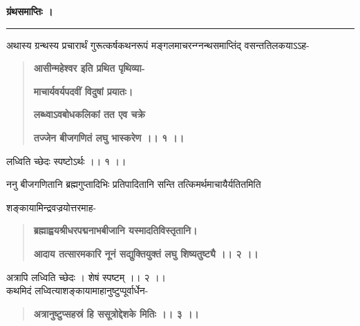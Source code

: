 \documentclass[11pt, openany]{book}
\begin{document}
\onehalfspacing
\begin{center}
\textbf{\large ग्रंथसमाप्तिः ।}

\rule{0.1\linewidth}{0.5pt}
\end{center}

\vspace{5mm}

\begin{sloppypar}
\hangindent=0.2in \hspace{0.2in}अथास्य ग्रन्थस्य प्रचारार्थं गुरूत्कर्षकथनरूपं मङ्गलमाचरन्ग्नन्थसमाप्तिंद् वसन्ततिलकयाऽऽह- 

\begin{quote}
\hspace{1in}\textbf{आसीन्महेश्वर इति प्रथित पृथिव्या-}

\hspace{1in}\textbf{माचार्यवर्यपदवीं विदुषां प्रयातः।}

\hspace{1in}\textbf{लब्ध्वाऽवबोधकलिकां तत एव चक्रे}

\hspace{1in}\textbf{तज्जेन बीजगणितं लघु भास्करेण ।। १ ।।}
\end{quote}

\hangindent=0.2in \hspace{0.2in}लध्विति च्छेदः स्पष्टोऽर्थः ।। १ ।। 

\hangindent=0.2in \hspace{0.2in}ननु बीजगणितानि ब्रह्मगुप्तादिभिः प्रतिपादितानि सन्ति तत्किमर्थमाचायैर्यतितमिति 

\hangindent=0.2in शङ्कायामिन्द्रवज्रयोत्तरमाह- 

\begin{quote}
\hspace{0.3in}\textbf{ब्रह्माह्वयश्रीधरपद्मनाभबीजानि यस्मादतिविस्तृतानि।}

\hspace{0.3in}\textbf{आदाय तत्सारमकारि नूनं सद्युक्तियुक्तं लघु शिष्यतुष्ट्यै ।। २ ।।}
\end{quote}

\hangindent=0.2in \hspace{0.2in}अत्रापि लध्विति च्छेदः । शेषं स्पष्टम् ।। २ ।।\\कथमिदं लध्वित्याशङ्कायामाहानुष्टुप्पूर्वार्धेन- 

\begin{quote}
\hspace{1in}\textbf{अत्रानुष्टुप्सहस्रं हि ससूत्रोद्देशके मितिः ।। ३ ।।}
\end{quote}


\end{sloppypar}
\end{document}
